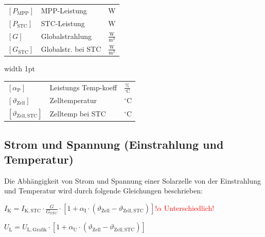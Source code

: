 \begin{minipage}[c]{0.43\columnwidth}
    \renewcommand{\arraystretch}{1.2}
    \begin{tabular}{@{} l p{2.5cm} l @{}}
        $[P_{\mathrm{MPP}}]$              & MPP-Leistung \dotfill                & $\mathrm{W}$ \\
        $[P_{\mathrm{STC}}]$              & STC-Leistung \dotfill           & $\mathrm{W}$ \\
        $[G]$                             & Globalstrahlung \dotfill                                 & $\frac{\mathrm{W}}{\mathrm{m^2}}$ \\
        $[G_{\mathrm{STC}}]$              & Globalstr. bei STC \dotfill            & $\frac{\mathrm{W}}{\mathrm{m^2}}$ 
    \end{tabular}
\end{minipage}
\hfill
\vrule width 1pt
\hfill
\begin{minipage}[c]{0.49\columnwidth}
    \renewcommand{\arraystretch}{1.2}
    \begin{tabular}{@{} l p{2.6cm} l @{}}
        $[\alpha_{\mathrm{P}}]$           & Leistungs Temp-koeff \dotfill              & $\frac{\%}{^\circ\mathrm{C}}$ \\
        $[\vartheta_{\mathrm{Zell}}]$     & Zelltemperatur \dotfill                                  & $^\circ\mathrm{C}$ \\
        $[\vartheta_{\mathrm{Zell},\mathrm{STC}}]$ & Zelltemp bei STC \dotfill & $^\circ\mathrm{C}$ 
    \end{tabular}
\end{minipage}



\subsection{Strom und Spannung (Einstrahlung und Temperatur)}

Die Abhängigkeit von Strom und Spannung einer Solarzelle von der Einstrahlung und Temperatur wird durch folgende Gleichungen beschrieben:

\vspace{0.1cm}

$\boxed{
I_{\mathrm{K}} = I_{\mathrm{K},\mathrm{STC}} \cdot \frac{G}{G_{\mathrm{STC}}} \cdot \left[1 + \alpha_{\mathrm{I}} \cdot \left(\vartheta_{\mathrm{Zell}} - \vartheta_{\mathrm{Zell},\mathrm{STC}}\right) \right]
}$\quad \textcolor{red}{!$\alpha$ Unterschiedlich!}

$\boxed{
U_{\mathrm{L}} = U_{\mathrm{L},\mathrm{Grafik}} \cdot \left[1 + \alpha_{\mathrm{U}} \cdot \left(\vartheta_{\mathrm{Zell}} - \vartheta_{\mathrm{Zell},\mathrm{STC}}\right) \right]
}$

